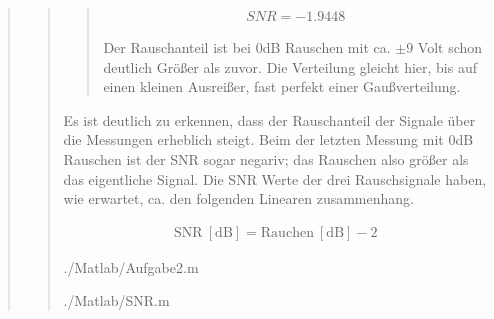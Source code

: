 \begin{quote}
\begin{quote}
\begin{quote}
            \begin{equation*}
            \begin{split}
                 SNR = -1.9448
            \end{split}
            \end{equation*}
            
            Der Rauschanteil ist bei 0dB Rauschen mit ca. $\pm9$ Volt schon deutlich Größer als zuvor. Die Verteilung gleicht
            hier, bis auf einen kleinen Ausreißer, fast perfekt einer Gaußverteilung.
            
        \end{quote}
        
        \vspace{4em}
        
        Es ist deutlich zu erkennen, dass der Rauschanteil der Signale über die Messungen erheblich steigt.
        Beim der letzten Messung mit 0dB Rauschen ist der SNR sogar negariv; das Rauschen also größer als das eigentliche Signal.
        Die SNR Werte der drei Rauschsignale haben, wie erwartet, ca. den folgenden Linearen zusammenhang.
        
        \begin{equation*}
    	\begin{split}
    		\mathrm{SNR \ [dB]} = \mathrm{Rauchen \ [dB]} - 2 
    	\end{split}
        \end{equation*}
        
        \newpage
        
            {./Matlab/Aufgabe2.m}
        
        
            {./Matlab/SNR.m}
        
    \end{quote}
    
    
\end{quote}





%     
%         

% 
% 
% 


